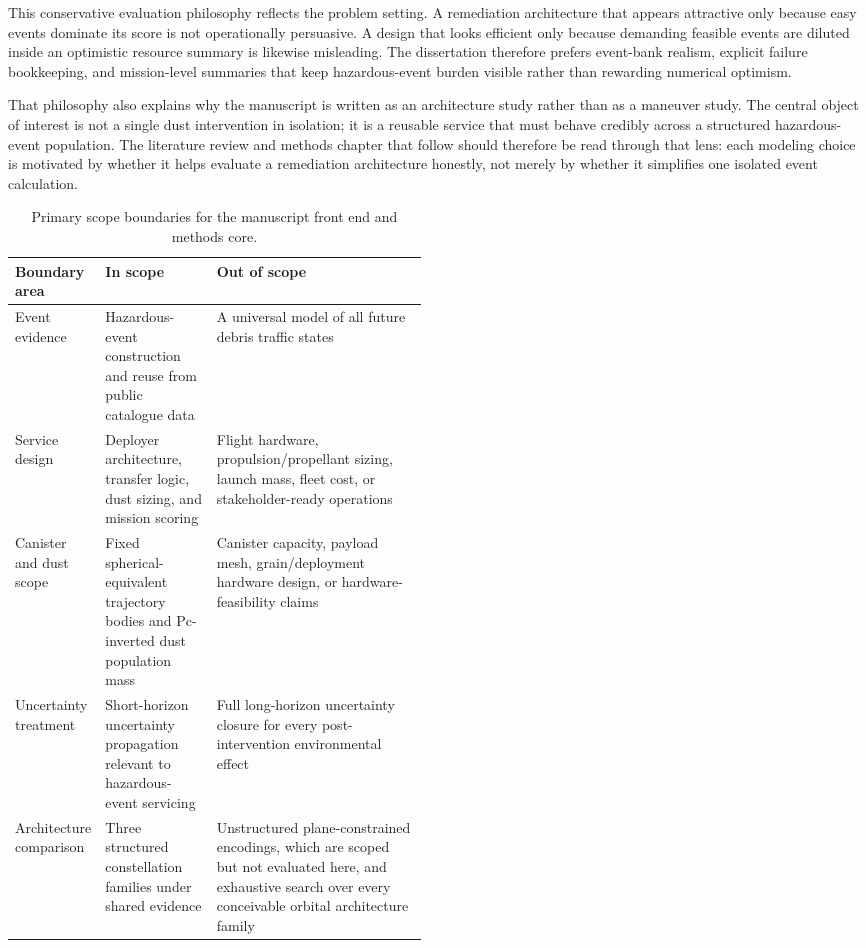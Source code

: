 This conservative evaluation philosophy reflects the problem setting. A remediation architecture that appears attractive only because easy events dominate its score is not operationally persuasive. A design that looks efficient only because demanding feasible events are diluted inside an optimistic resource summary is likewise misleading. The dissertation therefore prefers event-bank realism, explicit failure bookkeeping, and mission-level summaries that keep hazardous-event burden visible rather than rewarding numerical optimism.

That philosophy also explains why the manuscript is written as an architecture study rather than as a maneuver study. The central object of interest is not a single dust intervention in isolation; it is a reusable service that must behave credibly across a structured hazardous-event population. The literature review and methods chapter that follow should therefore be read through that lens: each modeling choice is motivated by whether it helps evaluate a remediation architecture honestly, not merely by whether it simplifies one isolated event calculation.

\begin{table}[htb]
    \centering
    \caption[Study scope boundaries]{Primary scope boundaries for the manuscript front end and methods core.}
    \label{tab:intro_scope_boundaries}
    \begin{tabularx}{0.92\linewidth}{@{}L{0.21\linewidth}L{0.27\linewidth}Y@{}}
        \toprule
        Boundary area & In scope & Out of scope \\
        \midrule
        Event evidence & Hazardous-event construction and reuse from public catalogue data & A universal model of all future debris traffic states \\
        Service design & Deployer architecture, transfer logic, dust sizing, and mission scoring & Flight hardware, propulsion/propellant sizing, launch mass, fleet cost, or stakeholder-ready operations \\
        Canister and dust scope & Fixed spherical-equivalent trajectory bodies and Pc-inverted dust population mass & Canister capacity, payload mesh, grain/deployment hardware design, or hardware-feasibility claims \\
        Uncertainty treatment & Short-horizon uncertainty propagation relevant to hazardous-event servicing & Full long-horizon uncertainty closure for every post-intervention environmental effect \\
        Architecture comparison & Three structured constellation families under shared evidence & Unstructured plane-constrained encodings, which are scoped but not evaluated here, and exhaustive search over every conceivable orbital architecture family \\
        \bottomrule
    \end{tabularx}
\end{table}

